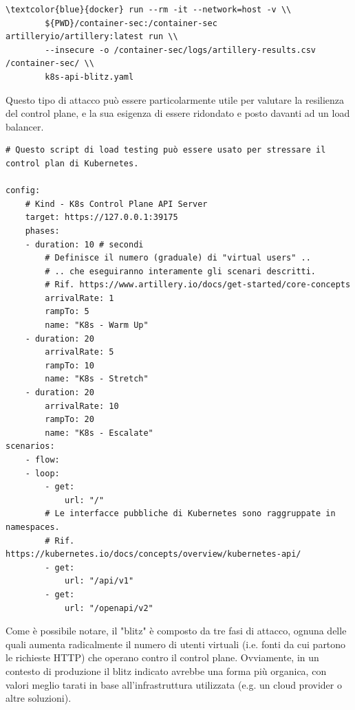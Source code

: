 \begin{small}
\begin{Verbatim}[commandchars=\\\{\}]
    \textcolor{blue}{docker} run --rm -it --network=host -v \\
        ${PWD}/container-sec:/container-sec artilleryio/artillery:latest run \\
        --insecure -o /container-sec/logs/artillery-results.csv /container-sec/ \\
        k8s-api-blitz.yaml
\end{Verbatim}
\end{small}

Questo tipo di attacco può essere particolarmente utile per valutare la resilienza del control plane, e la sua esigenza di essere ridondato e posto davanti ad un load balancer.

\begin{code}
\label{code:apx:a:yaml}
\begin{verbatim}
# Questo script di load testing può essere usato per stressare il control plan di Kubernetes.

config:
    # Kind - K8s Control Plane API Server
    target: https://127.0.0.1:39175
    phases:
    - duration: 10 # secondi
        # Definisce il numero (graduale) di "virtual users" .. 
        # .. che eseguiranno interamente gli scenari descritti.
        # Rif. https://www.artillery.io/docs/get-started/core-concepts
        arrivalRate: 1
        rampTo: 5
        name: "K8s - Warm Up"
    - duration: 20
        arrivalRate: 5
        rampTo: 10
        name: "K8s - Stretch"
    - duration: 20
        arrivalRate: 10
        rampTo: 20
        name: "K8s - Escalate"
scenarios:
    - flow:
    - loop:
        - get:
            url: "/"
        # Le interfacce pubbliche di Kubernetes sono raggruppate in namespaces.
        # Rif. https://kubernetes.io/docs/concepts/overview/kubernetes-api/
        - get:
            url: "/api/v1"
        - get:
            url: "/openapi/v2"
\end{verbatim}
\end{code}

Come è possibile notare, il "blitz" è composto da tre fasi di attacco, ognuna delle quali aumenta radicalmente il numero di utenti virtuali (i.e. fonti da cui partono le richieste HTTP) che operano contro il control plane. Ovviamente, in un contesto di produzione il blitz indicato avrebbe una forma più organica, con valori meglio tarati in base all'infrastruttura utilizzata (e.g. un cloud provider o altre soluzioni).

